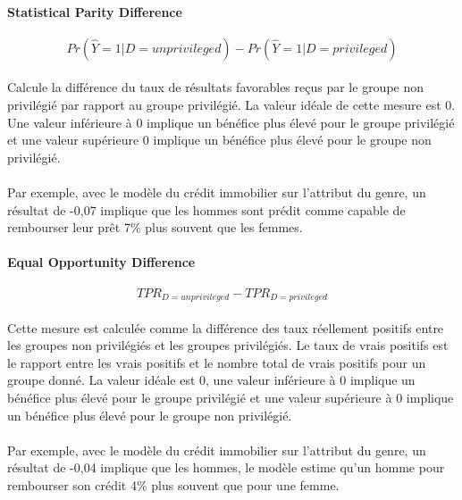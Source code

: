 \documentclass[10pt, french, a4paper]{report}
\begin{document}
\paragraph{Statistical Parity Difference}
\begin{equation}\label{eq:stat_par_diff}
  Pr(\hat{Y} = 1 | D = unprivileged) - Pr(\hat{Y} = 1 | D = privileged)
\end{equation}

\paragraph{}
Calcule la différence du taux de résultats favorables reçus par le groupe non privilégié par rapport au groupe privilégié. La valeur idéale de cette mesure est 0. Une valeur inférieure à 0 implique un bénéfice plus élevé pour le groupe privilégié et une valeur supérieure 0 implique un bénéfice plus élevé pour le groupe non privilégié.

\paragraph{}
Par exemple, avec le modèle du crédit immobilier sur l'attribut du genre, un résultat de -0,07 implique que les hommes sont prédit comme capable de rembourser leur prêt 7\% plus souvent que les femmes.

\paragraph{Equal Opportunity Difference}

\begin{equation}\label{eq:eq_oppo_diff}
  TPR_{D = unprivileged} - TPR_{D = privileged}
\end{equation}

\paragraph{}
Cette mesure est calculée comme la différence des taux réellement positifs entre les groupes non privilégiés et les groupes privilégiés. Le taux de vrais positifs est le rapport entre les vrais positifs et le nombre total de vrais positifs pour un groupe donné. La valeur idéale est 0, une valeur inférieure à 0 implique un bénéfice plus élevé pour le groupe privilégié et une valeur supérieure à 0 implique un bénéfice plus élevé pour le groupe non privilégié.

\paragraph{}
Par exemple, avec le modèle du crédit immobilier sur l'attribut du genre, un résultat de -0,04 implique que les hommes, le modèle estime qu'un homme pour rembourser son crédit 4\%  plus souvent que pour une femme.
\end{document}
